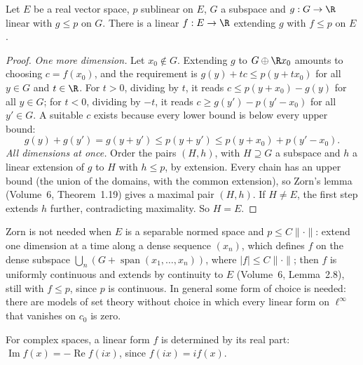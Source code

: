 \begin{theorem}\label{thm:hb}
Let $E$ be a real vector space, $p$ sublinear on $E$, $G$ a subspace and $g:G\to\R$ linear with $g\le p$ on $G$. There is a linear $f:E\to\R$ extending $g$ with $f\le p$ on $E$.
\end{theorem}
\begin{proof}
\emph{One more dimension.} Let $x_0\notin G$. Extending $g$ to $G\oplus\R x_0$ amounts to choosing $c=f(x_0)$, and the requirement is $g(y)+tc\le p(y+tx_0)$ for all $y\in G$ and $t\in\R$. For $t>0$, dividing by $t$, it
reads $c\le p(y+x_0)-g(y)$ for all $y\in G$; for $t<0$, dividing by $-t$, it reads $c\ge g(y')-p(y'-x_0)$ for all $y'\in G$. A suitable $c$ exists because every lower bound is below every upper bound:
\[g(y)+g(y')=g(y+y')\le p(y+y')\le p(y+x_0)+p(y'-x_0).\]
\emph{All dimensions at once.} Order the pairs $(H,h)$, with $H\supseteq G$ a subspace and $h$ a linear extension of $g$ to $H$ with $h\le p$, by extension. Every chain has an upper bound (the union of the domains,
with the common extension), so Zorn's lemma (Volume~6, Theorem~1.19) gives a maximal pair $(H,h)$. If $H\ne E$, the first step extends $h$ further, contradicting maximality. So $H=E$.
\end{proof}

\begin{remark}
Zorn is not needed when $E$ is a separable normed space and $p\le C\|\cdot\|$: extend one dimension at a time along a dense sequence $(x_n)$, which defines $f$ on the dense subspace $\bigcup_n(G+\operatorname{span}(x_1,\dots,x_n))$, where
$|f|\le C\|\cdot\|$; then $f$ is uniformly continuous and extends by continuity to $E$ (Volume~6, Lemma~2.8), still with $f\le p$, since $p$ is continuous. In general some form of choice is needed: there are models of set
theory without choice in which every linear form on $\ell^\infty$ that vanishes on $c_0$ is zero.
\end{remark}

For complex spaces, a linear form $f$ is determined by its real part: $\operatorname{Im}f(x)=-\operatorname{Re}f(ix)$, since $f(ix)=if(x)$.

